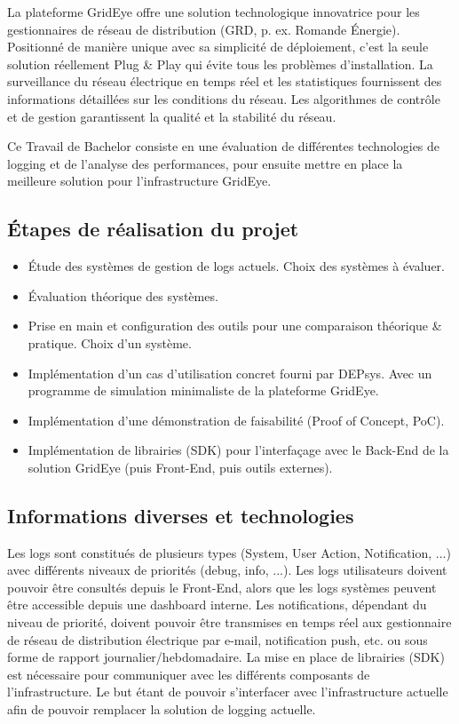 \documentclass[paper=a4, fontsize=11pt]{scrartcl}
\begin{document}
La plateforme GridEye offre une solution technologique innovatrice pour les gestionnaires de réseau de distribution (GRD, p. ex. Romande Énergie). Positionné de manière unique avec sa simplicité de déploiement, c'est la seule solution réellement Plug \& Play qui évite tous les problèmes d'installation. La surveillance du réseau électrique en temps réel et les statistiques fournissent des informations détaillées sur les conditions du réseau. Les algorithmes de contrôle et de gestion garantissent la qualité et la stabilité du réseau.

Ce Travail de Bachelor consiste en une évaluation de différentes technologies de logging et de l'analyse des performances, pour ensuite mettre en place la meilleure solution pour l'infrastructure GridEye.

\subsection{Étapes de réalisation du projet}

\begin{itemize}
    \item Étude des systèmes de gestion de logs actuels.
    \subitem Choix des systèmes à évaluer.
    \item Évaluation théorique des systèmes.
    \item Prise en main et configuration des outils pour une comparaison théorique \& pratique.
    \subitem Choix d'un système.
    \item Implémentation d'un cas d'utilisation concret fourni par DEPsys.
    \subitem Avec un programme de simulation minimaliste de la plateforme GridEye.
    \item Implémentation d'une démonstration de faisabilité (Proof of Concept, PoC).
    \item Implémentation de librairies (SDK) pour l'interfaçage avec le Back-End de la solution GridEye (puis Front-End, puis outils externes).
\end{itemize}

\subsection{Informations diverses et technologies}
Les logs sont constitués de plusieurs types (System, User Action, Notification, ...) avec différents niveaux de priorités (debug, info, ...). Les logs utilisateurs doivent pouvoir être consultés depuis le Front-End, alors que les logs systèmes peuvent être accessible depuis une dashboard interne. Les notifications, dépendant du niveau de priorité, doivent pouvoir être transmises en temps réel aux gestionnaire de réseau de distribution électrique  par e-mail, notification push, etc. ou sous forme de rapport journalier/hebdomadaire. La mise en place de librairies (SDK) est nécessaire pour communiquer avec les différents composants de l'infrastructure. Le but étant de pouvoir s'interfacer avec l'infrastructure actuelle afin de pouvoir remplacer la solution de logging actuelle.
\end{document}
